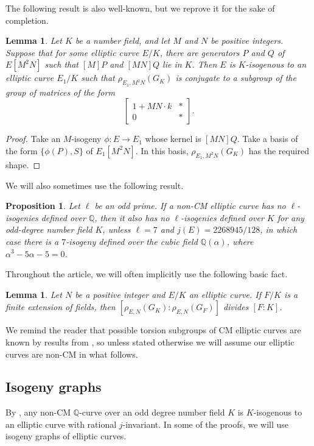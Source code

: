 \documentclass[10pt,leqno]{amsart}
\newcommand\m[1]{\begin{bmatrix}#1\end{bmatrix}}
\newcommand{\Q}{\mathbb{Q}}
\newtheorem{lemma}[theorem]{Lemma}
\newtheorem{proposition}[theorem]{Proposition}
\theoremstyle{definition}
\theoremstyle{remark}
\numberwithin{theorem}{section}
\begin{document}
The following result is also well-known, but we reprove it for the sake of completion.

\begin{lemma}\label{skok-s-izogenijom}
    Let $K$ be a number field, and let $M$ and $N$ be positive integers. Suppose that for some elliptic curve $E/K$, there are generators $P$ and $Q$ of $E[M^2N]$ such that $[M]P$ and $[MN]Q$ lie in $K$. Then $E$ is $K$-isogenous to an elliptic curve $E_1/K$ such that $\rho_{E_1, M^2N}(G_K)$ is conjugate to a subgroup of the group of matrices of the form $$\m{1+MN\cdot k & * \\ 0 & *}.$$
\end{lemma}
\begin{proof}
    Take an $M$-isogeny $\phi:E\to E_1$ whose kernel is $[MN]Q$. Take a basis of the form $\{\phi(P),S\}$ of $E_1[M^2N]$. In this basis, $\rho_{E_1, M^2N}(G_K)$ has the required shape.
\end{proof}


We will also sometimes use the following result.

\begin{proposition}\cite[Proposition 3.3.]{cremona-najman}\label{nadneparnimnistanovo}
    Let $\ell$ be an odd prime. If a non-CM elliptic curve has no $\ell$-isogenies defined over $\Q$, then it also has no $\ell$-isogenies defined over $K$ for any odd-degree number field $K$, unless $\ell=7$ and $j(E)=2268945/128$, in which case there is a $7$-isogeny defined over the cubic field $\Q(\alpha)$, where $\alpha^3-5\alpha-5=0$.
\end{proposition}

Throughout the article, we will often implicitly use the following basic fact.
\begin{lemma}
    Let $N$ be a positive integer and $E/K$ an elliptic curve. If $F/K$ is a finite extension of fields, then $[\rho_{E,N}(G_K):\rho_{E,N}(G_F)]$ divides $[F:K]$.
\end{lemma}

We remind the reader that possible torsion subgroups of CM elliptic curves are known by results from \cite{CMcase}, so unless stated otherwise we will assume our elliptic curves are non-CM in what follows.

\subsection{Isogeny graphs}

By , any non-CM $\Q$-curve over an odd degree number field $K$ is $K$-isogenous to an elliptic curve with rational $j$-invariant. In some of the proofs, we will use isogeny graphs of elliptic curves. 
\end{document}
